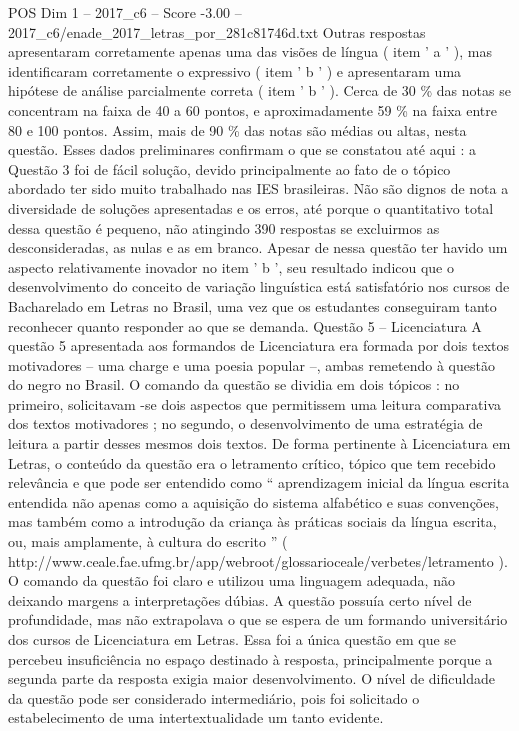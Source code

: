 \begin{textsample}{POS Dim 1 – 2017\_c6 – Score -3.00 – 2017\_c6/enade\_2017\_letras\_por\_281c81746d.txt}
Outras respostas apresentaram corretamente apenas uma das visões de língua ( item ' a ' ), mas identificaram corretamente o expressivo ( item ' b ' ) e apresentaram uma hipótese de análise parcialmente correta ( item ' b ' ).
Cerca de 30 \% das notas se concentram na faixa de 40 a 60 pontos, e aproximadamente 59 \% na faixa entre 80 e 100 pontos.
Assim, mais de 90 \% das notas são médias ou altas, nesta questão.
Esses dados preliminares confirmam o que se constatou até aqui : a Questão 3 foi de fácil solução, devido principalmente ao fato de o tópico abordado ter sido muito trabalhado nas IES brasileiras.
Não são dignos de nota a diversidade de soluções apresentadas e os erros, até porque o quantitativo total dessa questão é pequeno, não atingindo 390 respostas se excluirmos as desconsideradas, as nulas e as em branco.
Apesar de nessa questão ter havido um aspecto relativamente inovador no item ' b ', seu resultado indicou que o desenvolvimento do conceito de variação linguística está satisfatório nos cursos de Bacharelado em Letras no Brasil, uma vez que os estudantes conseguiram tanto reconhecer quanto responder ao que se demanda.
Questão 5 – Licenciatura A questão 5 apresentada aos formandos de Licenciatura era formada por dois textos motivadores – uma charge e uma poesia popular –, ambas remetendo à questão do negro no Brasil.
O comando da questão se dividia em dois tópicos : no primeiro, solicitavam -se dois aspectos que permitissem uma leitura comparativa dos textos motivadores ; no segundo, o desenvolvimento de uma estratégia de leitura a partir desses mesmos dois textos.
De forma pertinente à Licenciatura em Letras, o conteúdo da questão era o letramento crítico, tópico que tem recebido relevância e que pode ser entendido como “ aprendizagem inicial da língua escrita entendida não apenas como a aquisição do sistema alfabético e suas convenções, mas também como a introdução da criança às práticas sociais da língua escrita, ou, mais amplamente, à cultura do escrito ” ( http://www.ceale.fae.ufmg.br/app/webroot/glossarioceale/verbetes/letramento ).
O comando da questão foi claro e utilizou uma linguagem adequada, não deixando margens a interpretações dúbias.
A questão possuía certo nível de profundidade, mas não extrapolava o que se espera de um formando universitário dos cursos de Licenciatura em Letras.
Essa foi a única questão em que se percebeu insuficiência no espaço destinado à resposta, principalmente porque a segunda parte da resposta exigia maior desenvolvimento.
O nível de dificuldade da questão pode ser considerado intermediário, pois foi solicitado o estabelecimento de uma intertextualidade um tanto evidente.

\end{textsample}
